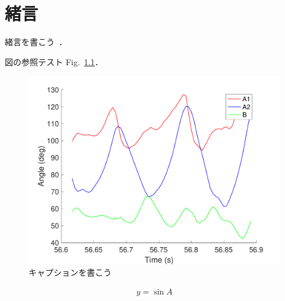 
\chapter{緒言}
\label{Chapter1}

緒言を書こう~\cite{bibtest}．

図の参照テスト Fig.~\ref{fig:test}．%


\begin{figure}[tb]
    \centering 
     \includegraphics[width=\columnwidth]{./figure/testfig.pdf}
     \caption{キャプションを書こう}
     \label{fig:test}
\end{figure}

\begin{align}
    y=\sin{A}
    \label{eq:test}
\end{align}


